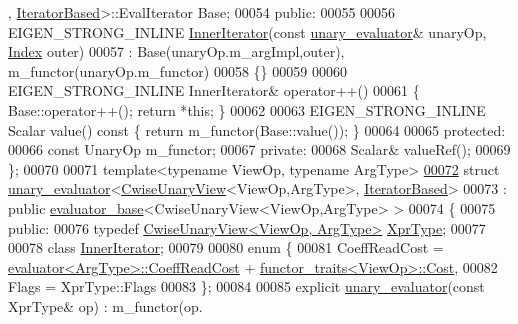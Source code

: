 \begin{DoxyCode}
      , \hyperlink{struct_eigen_1_1internal_1_1_iterator_based}{IteratorBased}>::EvalIterator Base;
00054   \textcolor{keyword}{public}:
00055 
00056     EIGEN\_STRONG\_INLINE \hyperlink{class_eigen_1_1_inner_iterator}{InnerIterator}(\textcolor{keyword}{const} \hyperlink{struct_eigen_1_1internal_1_1unary__evaluator}{unary\_evaluator}& unaryOp, 
      \hyperlink{namespace_eigen_a62e77e0933482dafde8fe197d9a2cfde}{Index} outer)
00057       : Base(unaryOp.m\_argImpl,outer), m\_functor(unaryOp.m\_functor)
00058     \{\}
00059 
00060     EIGEN\_STRONG\_INLINE InnerIterator& operator++()
00061     \{ Base::operator++(); \textcolor{keywordflow}{return} *\textcolor{keyword}{this}; \}
00062 
00063     EIGEN\_STRONG\_INLINE Scalar value()\textcolor{keyword}{ const }\{ \textcolor{keywordflow}{return} m\_functor(Base::value()); \}
00064 
00065   \textcolor{keyword}{protected}:
00066     \textcolor{keyword}{const} UnaryOp m\_functor;
00067   \textcolor{keyword}{private}:
00068     Scalar& valueRef();
00069 \};
00070 
00071 \textcolor{keyword}{template}<\textcolor{keyword}{typename} ViewOp, \textcolor{keyword}{typename} ArgType>
\hyperlink{struct_eigen_1_1internal_1_1unary__evaluator_3_01_cwise_unary_view_3_01_view_op_00_01_arg_type_01_4_00_01_iterator_based_01_4}{00072} \textcolor{keyword}{struct }\hyperlink{struct_eigen_1_1internal_1_1unary__evaluator}{unary\_evaluator}<\hyperlink{group___core___module_class_eigen_1_1_cwise_unary_view}{CwiseUnaryView}<ViewOp,ArgType>, 
      \hyperlink{struct_eigen_1_1internal_1_1_iterator_based}{IteratorBased}>
00073   : \textcolor{keyword}{public} \hyperlink{struct_eigen_1_1internal_1_1evaluator__base}{evaluator\_base}<CwiseUnaryView<ViewOp,ArgType> >
00074 \{
00075   \textcolor{keyword}{public}:
00076     \textcolor{keyword}{typedef} \hyperlink{group___core___module_class_eigen_1_1_cwise_unary_view}{CwiseUnaryView<ViewOp, ArgType>} 
      \hyperlink{group___core___module_class_eigen_1_1_cwise_unary_view}{XprType};
00077 
00078     \textcolor{keyword}{class }\hyperlink{class_eigen_1_1_inner_iterator}{InnerIterator};
00079     
00080     \textcolor{keyword}{enum} \{
00081       CoeffReadCost = \hyperlink{struct_eigen_1_1internal_1_1evaluator}{evaluator<ArgType>::CoeffReadCost} + 
      \hyperlink{struct_eigen_1_1internal_1_1functor__traits}{functor\_traits<ViewOp>::Cost},
00082       Flags = XprType::Flags
00083     \};
00084     
00085     \textcolor{keyword}{explicit} \hyperlink{struct_eigen_1_1internal_1_1unary__evaluator}{unary\_evaluator}(\textcolor{keyword}{const} XprType& op) : m\_functor(op.

\end{DoxyCode}
